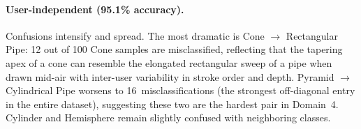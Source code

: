 \begin{table}[H]
\centering
\caption{Confusion matrix -- Domain~4, user-dependent (98.6\%).}
\label{tab:cm_d4_dep}
\end{table}

\paragraph{User-independent (95.1\% accuracy).}
Confusions intensify and spread. The most dramatic is Cone $\to$ Rectangular Pipe: 12 out of 100 Cone samples are misclassified, reflecting that the tapering apex of a cone can resemble the elongated rectangular sweep of a pipe when drawn mid-air with inter-user variability in stroke order and depth. Pyramid $\to$ Cylindrical Pipe worsens to 16~misclassifications (the strongest off-diagonal entry in the entire dataset), suggesting these two are the hardest pair in Domain~4. Cylinder and Hemisphere remain slightly confused with neighboring classes.

